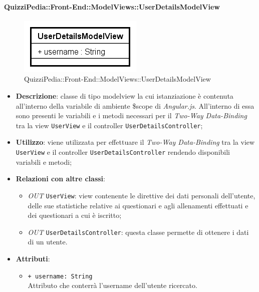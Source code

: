 \paragraph{QuizziPedia::Front-End::ModelViews::UserDetailsModelView}
		
		\label{QuizziPedia::Front-End::ModelViews::UserDetailsModelView}
		
		\begin{figure}[ht]
			\centering
			\includegraphics[scale=0.5,keepaspectratio]{UML/Classi/Front-End/QuizziPedia_Front-end_ModelView_UserDetailsModelView.png}
			\caption{QuizziPedia::Front-End::ModelViews::UserDetailsModelView}
		\end{figure} \FloatBarrier
		
		\begin{itemize}
			\item \textbf{Descrizione}: classe di tipo modelview la cui istanziazione è contenuta all'interno della variabile di ambiente \$scope di \textit{Angular.js}. All'interno di essa sono presenti le variabili e i metodi necessari per il \textit{Two-Way Data-Binding} tra la view \texttt{UserView} e il controller \texttt{UserDetailsController};
			\item \textbf{Utilizzo}: viene utilizzata per effettuare il \textit{Two-Way Data-Binding} tra la view \texttt{UserView} e il controller \texttt{UserDetailsController} rendendo disponibili variabili e metodi;
			\item \textbf{Relazioni con altre classi}: 
			\begin{itemize}
				\item \textit{OUT} \texttt{UserView}: view contenente le direttive dei dati personali dell'utente, delle sue statistiche relative ai questionari e agli allenamenti effettuati e dei questionari a cui è iscritto; 
				\item \textit{OUT} \texttt{UserDetailsController}: questa classe permette di ottenere i dati di un utente.
			\end{itemize}
			\item \textbf{Attributi}: 
			\begin{itemize}
				\item \texttt{+ username: String} \\ Attributo che conterrà l'username dell'utente ricercato.
			\end{itemize}
		\end{itemize}
		
			